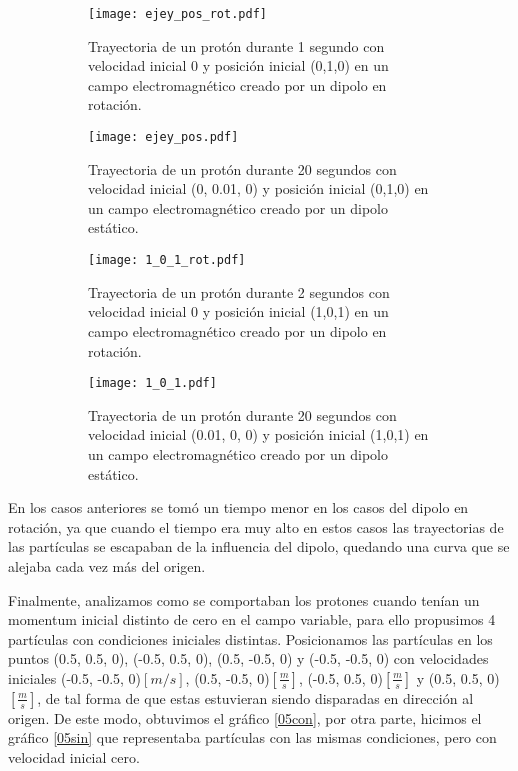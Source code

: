 \documentclass{article}
\begin{document}
\begin{figure}[h]
    \centering
    \begin{subfigure}[b]{0.245\textwidth}
        \centering
        \texttt{[image: ejey\_pos\_rot.pdf]}
        \caption{Trayectoria de un protón durante 1 segundo con velocidad inicial 0 y posición inicial (0,1,0) en un campo electromagnético creado por un dipolo en rotación.}
        \label{y_rot}
    \end{subfigure}
    \hfill
    \begin{subfigure}[b]{0.245\textwidth}
        \centering
        \texttt{[image: ejey\_pos.pdf]}
        \caption{Trayectoria de un protón durante 20 segundos con velocidad inicial (0, 0.01, 0) y posición inicial (0,1,0) en un campo electromagnético creado por un dipolo estático.}
        \label{y}
    \end{subfigure}
    \hfill
    \begin{subfigure}[b]{0.245\textwidth}
        \centering
        \texttt{[image: 1\_0\_1\_rot.pdf]}
        \caption{Trayectoria de un protón durante 2 segundos con velocidad inicial 0 y posición inicial (1,0,1) en un campo electromagnético creado por un dipolo en rotación.}
        \label{101_rot}
    \end{subfigure}
    \hfill
    \begin{subfigure}[b]{0.245\textwidth}
        \centering
        \texttt{[image: 1\_0\_1.pdf]}
        \caption{Trayectoria de un protón durante 20 segundos con velocidad inicial (0.01, 0, 0) y posición inicial (1,0,1) en un campo electromagnético creado por un dipolo estático.}
        \label{101}
    \end{subfigure}
    \caption{}
    \label{}
\end{figure}


\vspace{2mm}
En los casos anteriores se tomó un tiempo menor en los casos del dipolo en rotación, ya que cuando el tiempo era muy alto en estos casos las trayectorias de las partículas se escapaban de la influencia del dipolo, quedando una curva que se alejaba cada vez más del origen.

\vspace{2mm}
Finalmente, analizamos como se comportaban los protones cuando tenían un momentum inicial distinto de cero en el campo variable, para ello propusimos 4 partículas con condiciones iniciales distintas. Posicionamos las partículas en los puntos (0.5, 0.5, 0), (-0.5, 0.5, 0), (0.5, -0.5, 0) y (-0.5, -0.5, 0) con velocidades iniciales (-0.5, -0.5, 0)$[m/s]$, (0.5, -0.5, 0)$[\frac{m}{s}]$, (-0.5, 0.5, 0)$[\frac{m}{s}]$ y (0.5, 0.5, 0)$[\frac{m}{s}]$, de tal forma de que estas estuvieran siendo disparadas en dirección al origen. De este modo, obtuvimos el gráfico \ref{05con}, por otra parte, hicimos el gráfico \ref{05sin} que representaba partículas con las mismas condiciones, pero con velocidad inicial cero.
\end{document}
